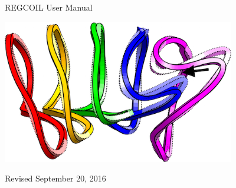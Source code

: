 \begin{center}

\vspace*{2in}

{\Huge REGCOIL User Manual}

\vspace{1in}

\centerline{\includegraphics[width=4in]{m20160801_01_compareNescoilToRegcoilCoils.png}}


\vspace{2.0in}

Revised September 20, 2016

\end{center}

